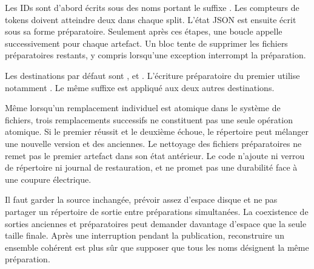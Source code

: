 Les IDs sont d'abord écrits sous des noms portant le suffixe
. Les compteurs de tokens doivent atteindre deux dans
chaque split. L'état JSON est ensuite écrit sous sa forme préparatoire.
Seulement après ces étapes, une boucle appelle 
successivement pour chaque artefact.
Un bloc  tente de supprimer les fichiers préparatoires restants,
y compris lorsqu'une exception interrompt la préparation.

{\raggedright
Les destinations par défaut sont
,
et
.
L'écriture préparatoire du premier utilise notamment
.
Le même suffixe est appliqué aux deux autres destinations.\par}

Même lorsqu'un remplacement individuel est atomique dans le système de fichiers,
trois remplacements successifs ne constituent pas une seule opération atomique.
Si le premier réussit et le deuxième échoue, le répertoire peut mélanger
une nouvelle version et des anciennes. Le nettoyage des fichiers préparatoires
ne remet pas le premier artefact dans son état antérieur.
Le code n'ajoute ni verrou de répertoire ni journal de restauration,
et ne promet pas une durabilité face à une coupure électrique.

Il faut garder la source inchangée, prévoir assez d'espace disque et
ne pas partager un répertoire de sortie entre préparations simultanées.
La coexistence de sorties anciennes et préparatoires peut demander davantage
d'espace que la seule taille finale. Après une interruption pendant la
publication, reconstruire un ensemble cohérent est plus sûr que supposer
que tous les noms désignent la même préparation.


